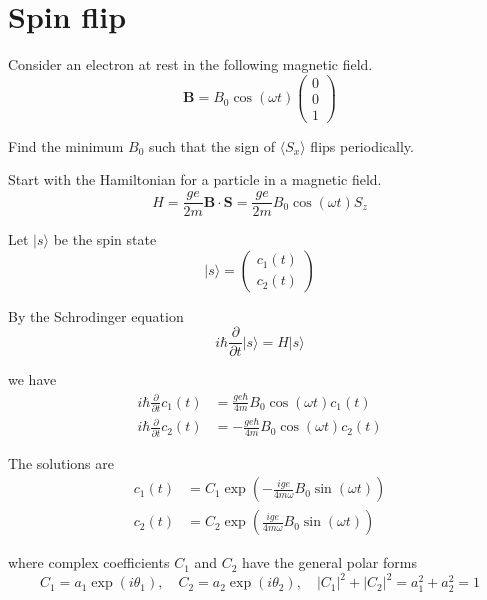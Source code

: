 

\section*{Spin flip}

Consider an electron at rest in the following magnetic field.
\begin{equation*}
\mathbf B=B_0\cos(\omega t)\begin{pmatrix}0\\0\\1\end{pmatrix}
\end{equation*}

Find the minimum $B_0$ such that the sign of $\langle S_x\rangle$
flips periodically.

\bigskip
Start with the Hamiltonian for a particle in a magnetic field.
\begin{equation*}
H=\frac{ge}{2m}\mathbf B\cdot\mathbf S
=\frac{ge}{2m}B_0\cos(\omega t)S_z
\end{equation*}

Let $|s\rangle$ be the spin state
\begin{equation*}
|s\rangle=\begin{pmatrix}c_1(t)\\c_2(t)\end{pmatrix}
\end{equation*}

By the Schrodinger equation
\begin{equation*}
i\hbar\frac{\partial}{\partial t}|s\rangle=H|s\rangle
\end{equation*}

we have
\begin{align*}
i\hbar\frac{\partial}{\partial t}c_1(t)&=\frac{ge\hbar}{4m}B_0\cos(\omega t)c_1(t)
\\
i\hbar\frac{\partial}{\partial t}c_2(t)&=-\frac{ge\hbar}{4m}B_0\cos(\omega t)c_2(t)
\end{align*}

The solutions are
\begin{equation*}
\begin{aligned}
c_1(t)&=C_1\exp\left(-\frac{ige}{4m\omega}B_0\sin(\omega t)\right)
\\
c_2(t)&=C_2\exp\left(\frac{ige}{4m\omega}B_0\sin(\omega t)\right)
\end{aligned}
\tag{1}
\end{equation*}

where complex coefficients $C_1$ and $C_2$ have the general polar forms
\begin{equation*}
C_1=a_1\exp(i\theta_1),\quad C_2=a_2\exp(i\theta_2),\quad|C_1|^2+|C_2|^2=a_1^2+a_2^2=1
\end{equation*}

